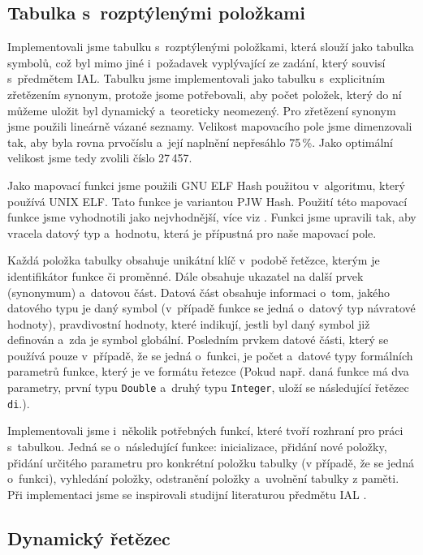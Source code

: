 \documentclass[a4paper, 11pt]{article}
\begin{document}
	\subsection{Tabulka s~rozptýlenými položkami}

	Implementovali jsme tabulku s~rozptýlenými položkami, která slouží jako tabulka symbolů, což byl mimo
	jiné i~požadavek vyplývající ze zadání, který souvisí s~předmětem IAL. Tabulku jsme implementovali
	jako tabulku s~explicitním zřetězením synonym, protože jsome potřebovali, aby počet položek,
	který do ní můžeme uložit byl dynamický a~teoreticky neomezený. Pro zřetězení synonym jsme použili
	lineárně vázané seznamy. Velikost mapovacího pole jsme dimenzovali tak, aby byla rovna prvočíslu a~její
	naplnění nepřesáhlo 75\,\%. Jako optimální velikost jsme tedy zvolili číslo 27\,457.

	Jako mapovací funkci jsme použili GNU ELF Hash použitou v~algoritmu, který používá UNIX ELF.
	Tato funkce je variantou PJW Hash. Použití této mapovací funkce jsme vyhodnotili jako nejvhodnější,
	více viz \cite{PJWHashFunction2017}. Funkci jsme upravili tak, aby vracela datový typ a~hodnotu,
	která je přípustná pro naše mapovací pole.

	Každá položka tabulky obsahuje unikátní klíč v~podobě řetězce, kterým je identifikátor funkce
	či proměnné. Dále obsahuje ukazatel na další prvek (synonymum) a~datovou část. Datová část obsahuje
	informaci o~tom, jakého datového typu je daný symbol (v~případě funkce se jedná o~datový typ
	návratové hodnoty), pravdivostní hodnoty, které indikují, jestli byl daný symbol již definován
	a~zda je symbol globální. Posledním prvkem datové části, který se používá pouze v~případě, že se
	jedná o~funkci, je počet a~datové typy formálních parametrů funkce, který je ve formátu řetezce
	(Pokud např. daná funkce má dva parametry, první typu \texttt{Double} a~druhý typu \texttt{Integer},
	uloží se následující řetězec \texttt{di}.).

	Implementovali jsme i~několik potřebných funkcí, které tvoří rozhraní pro práci s~tabulkou.
	Jedná se o~následující funkce: inicializace, přidání nové položky, přidání určitého parametru
	pro konkrétní položku tabulky (v případě, že se jedná o~funkci), vyhledání položky, odstranění
	položky a~uvolnění tabulky z paměti. Při implementaci jsme se inspirovali studijní literaturou
	předmětu IAL \cite{Honzik1991}.


	\subsection{Dynamický řetězec}
\end{document}
